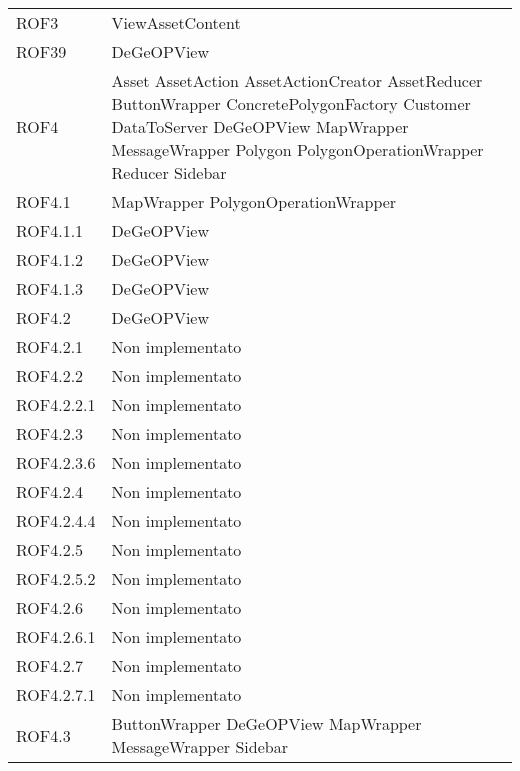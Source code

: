 \begin{longtable}{p{2.5cm}!{\VRule[1pt]}p{5cm}}
	ROF3 & ViewAssetContent\\
	ROF39 & DeGeOPView\\
	ROF4 & Asset \newline AssetAction \newline AssetActionCreator \newline AssetReducer \newline ButtonWrapper \newline ConcretePolygonFactory \newline Customer \newline DataToServer \newline DeGeOPView \newline MapWrapper \newline MessageWrapper \newline Polygon \newline PolygonOperationWrapper \newline Reducer \newline Sidebar\\
	ROF4.1 & MapWrapper \newline PolygonOperationWrapper\\
	ROF4.1.1 & DeGeOPView\\
	ROF4.1.2 & DeGeOPView\\
	ROF4.1.3 & DeGeOPView\\
	ROF4.2 & DeGeOPView\\
	ROF4.2.1 & Non implementato\\
	ROF4.2.2 & Non implementato\\
	ROF4.2.2.1 & Non implementato\\
	ROF4.2.3 & Non implementato\\
	ROF4.2.3.6 & Non implementato\\
	ROF4.2.4 & Non implementato\\
	ROF4.2.4.4 & Non implementato\\
	ROF4.2.5 & Non implementato\\
	ROF4.2.5.2 & Non implementato\\
	ROF4.2.6 & Non implementato\\
	ROF4.2.6.1 & Non implementato\\
	ROF4.2.7 & Non implementato\\
	ROF4.2.7.1 & Non implementato\\
	ROF4.3 & ButtonWrapper \newline DeGeOPView \newline MapWrapper \newline MessageWrapper \newline Sidebar\\

\end{longtable}
